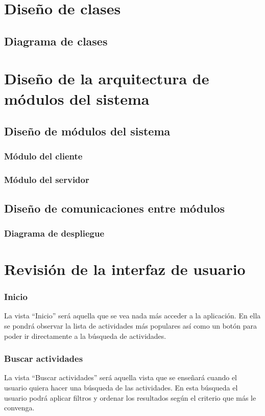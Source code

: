 \section{Diseño de clases}
\subsection{Diagrama de clases}

\section{Diseño de la arquitectura de módulos del sistema}
\subsection{Diseño de módulos del sistema}
\subsubsection{Módulo del cliente}

\subsubsection{Módulo del servidor}

\subsection{Diseño de comunicaciones entre módulos}
\subsubsection{Diagrama de despliegue}


\section{Revisión de la interfaz de usuario}
\subsubsection{Inicio}
La vista “Inicio” será aquella que se vea nada más acceder a la aplicación. En ella se pondrá observar la lista de actividades más populares así como un botón para poder ir directamente a la búsqueda de actividades.

\subsubsection{Buscar actividades}
La vista “Buscar actividades” será aquella vista que se enseñará cuando el usuario quiera hacer una búsqueda de las actividades. En esta búsqueda el usuario podrá aplicar filtros y ordenar los resultados según el criterio que más le convenga.

